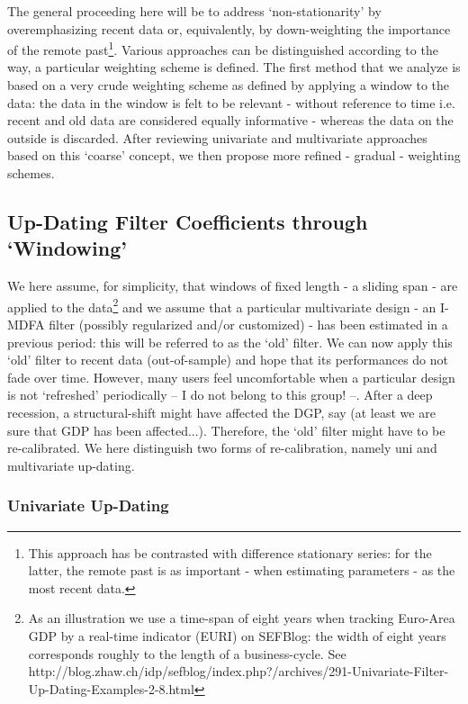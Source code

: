 \documentclass[11pt]{article}
\begin{document}
The general proceeding here will be to address `non-stationarity' by overemphasizing recent data or, equivalently, by down-weighting the importance of the remote past\footnote{This approach has be contrasted with difference stationary series: for the latter, the remote past is as important - when estimating parameters - as the most recent data.}. Various approaches can be distinguished according to the way, a particular weighting scheme is defined. The first method that we analyze is based on a very crude weighting scheme as defined by applying a window to the data: the data in the window is felt to be relevant - without reference to time i.e. recent and old data are considered equally informative - whereas the data on the outside is discarded. After reviewing univariate and multivariate approaches based on this `coarse'  concept, we then propose more refined - gradual - weighting schemes.

 

\subsection{Up-Dating Filter Coefficients through `Windowing'}

We here assume, for simplicity, that windows of fixed length - a sliding span - are applied to the data\footnote{As an illustration we use a time-span of eight years when tracking Euro-Area GDP by a real-time indicator (EURI) on SEFBlog: the width of eight years corresponds roughly to the length of a business-cycle. See http://blog.zhaw.ch/idp/sefblog/index.php?/archives/291-Univariate-Filter-Up-Dating-Examples-2-8.html} and we assume that a particular multivariate design - an I-MDFA filter (possibly regularized and/or customized) - has been estimated in a previous period: this will be referred to as the `old' filter. We can now apply this `old' filter to recent data (out-of-sample) and hope that its performances do not fade over time. However, many users feel uncomfortable when a particular design is not `refreshed' periodically -- I do not belong to this group! --. After a deep recession, a structural-shift might have affected the DGP, say (at least we are sure that GDP has been affected...). Therefore, the `old' filter might have to be re-calibrated. We here distinguish two forms of re-calibration, namely  uni and multivariate up-dating.

\subsubsection{Univariate Up-Dating}\label{uudat}
\end{document}
